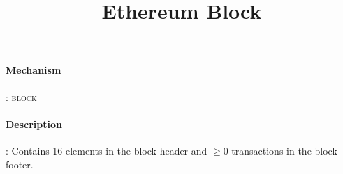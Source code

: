 \documentclass[9pt,a4paper,oneside]{scrartcl}
\author{}
\title{Ethereum Block}
\date{}
\begin{document}
\maketitle
\paragraph{Mechanism}: \textsc{block}
\paragraph{Description}: Contains 16 elements in the block header and $\geq 0$ transactions in the block footer.


\printbibliography
\end{document}
